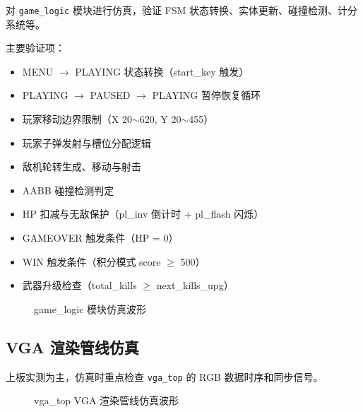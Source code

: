 \documentclass[12pt,a4paper]{ctexart}
\begin{document}
对 \texttt{game\_logic} 模块进行仿真，验证 FSM 状态转换、实体更新、碰撞检测、计分系统等。

主要验证项：
\begin{itemize}
    \item MENU $\rightarrow$ PLAYING 状态转换（start\_key 触发）
    \item PLAYING $\rightarrow$ PAUSED $\rightarrow$ PLAYING 暂停恢复循环
    \item 玩家移动边界限制（X 20$\sim$620, Y 20$\sim$455）
    \item 玩家子弹发射与槽位分配逻辑
    \item 敌机轮转生成、移动与射击
    \item AABB 碰撞检测判定
    \item HP 扣减与无敌保护（pl\_inv 倒计时 + pl\_flash 闪烁）
    \item GAMEOVER 触发条件（HP = 0）
    \item WIN 触发条件（积分模式 score $\ge$ 500）
    \item 武器升级检查（total\_kills $\ge$ next\_kills\_upg）
\end{itemize}

\begin{figure}[H]
\centering
\caption{game\_logic 模块仿真波形}
\label{fig:sim_logic}
\end{figure}

\subsection{VGA 渲染管线仿真}

上板实测为主，仿真时重点检查 \texttt{vga\_top} 的 RGB 数据时序和同步信号。

\begin{figure}[H]
\centering
\caption{vga\_top VGA 渲染管线仿真波形}
\label{fig:sim_vga}
\end{figure}
\end{document}

